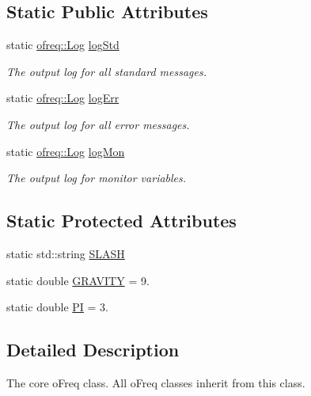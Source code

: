 \subsection*{Static Public Attributes}
\begin{DoxyCompactItemize}
\item 
static \hyperlink{classosea_1_1ofreq_1_1_log}{ofreq\-::\-Log} \hyperlink{classosea_1_1ofreq_1_1o_freq_core_a58bc30d906c3092933a8fa71fc43081f}{log\-Std}
\begin{DoxyCompactList}\small\item\em The output log for all standard messages. \end{DoxyCompactList}\item 
static \hyperlink{classosea_1_1ofreq_1_1_log}{ofreq\-::\-Log} \hyperlink{classosea_1_1ofreq_1_1o_freq_core_ace3212e130c495113fc339135da117b5}{log\-Err}
\begin{DoxyCompactList}\small\item\em The output log for all error messages. \end{DoxyCompactList}\item 
static \hyperlink{classosea_1_1ofreq_1_1_log}{ofreq\-::\-Log} \hyperlink{classosea_1_1ofreq_1_1o_freq_core_a3432825cd5d03858fca93c85a055f0d4}{log\-Mon}
\begin{DoxyCompactList}\small\item\em The output log for monitor variables. \end{DoxyCompactList}\end{DoxyCompactItemize}
\subsection*{Static Protected Attributes}
\begin{DoxyCompactItemize}
\item 
static std\-::string \hyperlink{classosea_1_1ofreq_1_1o_freq_core_ad7a03236bc96443ec94efa89e86db816}{S\-L\-A\-S\-H}
\item 
static double \hyperlink{classosea_1_1ofreq_1_1o_freq_core_ab742e33230346e648843db715e5f7f9e}{G\-R\-A\-V\-I\-T\-Y} = 9.
\item 
static double \hyperlink{classosea_1_1ofreq_1_1o_freq_core_a4322d17b5d6a31ae1118aba876b46c88}{P\-I} = 3.
\end{DoxyCompactItemize}


\subsection{Detailed Description}
The core o\-Freq class. All o\-Freq classes inherit from this class. 

